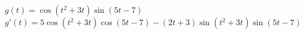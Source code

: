{$g(t)   = \cos(t^2+3t)\sin(5t-7)$
}
{$g'(t) = 5\cos(t^2+3t)\cos(5t-7)- (2t+3)\sin(t^2+3t)\sin(5t-7)$
}
